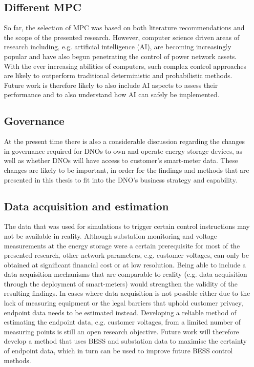 \subsection{Different MPC}

So far, the selection of MPC was based on both literature recommendations and the scope of the presented research.
However, computer science driven areas of research including, e.g. artificial intelligence (AI), are becoming increasingly popular and have also begun penetrating the control of power network assets.
With the ever increasing abilities of computers, such complex control approaches are likely to outperform traditional deterministic and probabilistic methods.
Future work is therefore likely to also include AI aspects to assess their performance and to also understand how AI can safely be implemented.

\subsection{Governance}

At the present time there is also a considerable discussion regarding the changes in governance required for DNOs to own and operate energy storage devices, as well as whether DNOs will have access to customer's smart-meter data.
These changes are likely to be important, in order for the findings and methods that are presented in this thesis to fit into the DNO's business strategy and capability.

\subsection{Data acquisition and estimation}

The data that was used for simulations to trigger certain control instructions may not be available in reality.
Although substation monitoring and voltage measurements at the energy storage were a certain prerequisite for most of the presented research, other network parameters, e.g. customer voltages, can only be obtained at significant financial cost or at low resolution.
Being able to include a data acquisition mechanisms that are comparable to reality (e.g. data acquisition through the deployment of smart-meters) would strengthen the validity of the resulting findings.
In cases where data acquisition is not possible either due to the lack of measuring equipment or the legal barriers that uphold customer privacy, endpoint data needs to be estimated instead.
Developing a reliable method of estimating the endpoint data, e.g. customer voltages, from a limited number of measuring points is still an open research objective.
Future work will therefore develop a method that uses BESS and substation data to maximise the certainty of endpoint data, which in turn can be used to improve future BESS control methods.








